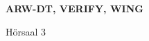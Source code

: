 \documentclass[a4paper]{article}
\begin{document}
\printGenericVSLHeader
\begin{center}
\begin{vsltext}{3cm}{4cm}

   \vspace{0.5cm} 

    \textbf{ARW-DT, VERIFY, WING} 

    \vspace{1.5cm}

    Hörsaal 3

\end{vsltext}

\end{center}
\end{document}
